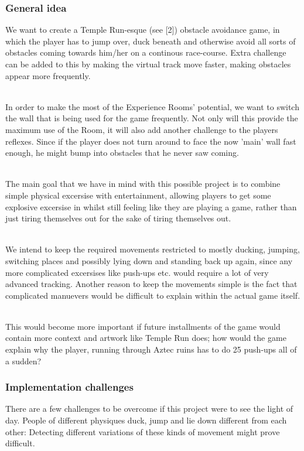 \documentclass[11pt]{article}
\begin{document}
\subsubsection*{General idea}
We want to create a Temple Run-esque (see [2]) obstacle avoidance game, in which the player has to jump over, duck beneath and otherwise avoid all sorts of obstacles coming towards him/her on a continous race-course. Extra challenge can be added to this by making the virtual track move faster, making obstacles appear more frequently. 

~\\
In order to make the most of the Experience Rooms' potential, we want to switch the wall that is being used for the game frequently. Not only will this provide the maximum use of the Room, it will also add another challenge to the players reflexes. Since if the player does not turn around to face the now 'main' wall fast enough, he might bump into obstacles that he never saw coming.

~\\
The main goal that we have in mind with this possible project is to combine simple physical excersise with entertainment, allowing players to get some explosive excersise in whilst still feeling like they are playing a game, rather than just tiring themselves out for the sake of tiring themselves out.

~\\
We intend to keep the required movements restricted to mostly ducking, jumping, switching places and possibly lying down and standing back up again, since any more complicated excersises like push-ups etc. would require a lot of very advanced tracking. Another reason to keep the movements simple is the fact that complicated manuevers would be difficult to explain within the actual game itself. 

~\\
This would become more important if future installments of the game would contain more context and artwork like Temple Run does; how would the game explain why the player, running through Aztec ruins has to do 25 push-ups all of a sudden?


\newpage
{}
\subsubsection*{Implementation challenges}
There are a few challenges to be overcome if this project were to see the light of day. People of different physiques duck, jump and lie down different from each other: Detecting different variations of these kinds of movement might prove difficult. 
\end{document}
